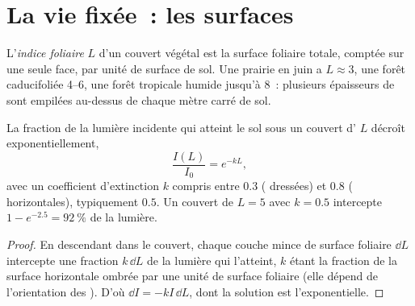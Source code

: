 \section{La vie fixée~: les surfaces}

\begin{definition}\label{def:b1:flowering-plant-organization:lai}
L'\emph{indice foliaire} $L$ d'un couvert végétal
est la surface foliaire totale, comptée sur une seule face, par unité de
surface de sol. Une prairie en juin a $L \approx 3$, une forêt
caducifoliée \qtyrange{4}{6}{}, une forêt tropicale humide jusqu'à
\qty{8}{}~: plusieurs épaisseurs de  sont empilées au-dessus de
chaque mètre carré de sol.
\end{definition}

\begin{proposition}\label{prop:b1:flowering-plant-organization:beer}
La fraction de la lumière incidente qui atteint le sol sous un couvert
d' $L$ décroît exponentiellement,
\[
\frac{I(L)}{I_0} = e^{-kL},
\]
avec un coefficient d'extinction $k$ compris entre $0.3$ (
dressées) et $0.8$ ( horizontales), typiquement $0.5$. Un
couvert de $L = 5$ avec $k = 0.5$ intercepte
$1 - e^{-2.5} = \qty{92}{\%}$ de la lumière.
\end{proposition}
\begin{proof}
En descendant dans le couvert, chaque couche mince de surface foliaire
$\dd L$ intercepte une fraction $k\,\dd L$ de la lumière qui l'atteint,
$k$ étant la fraction de la surface horizontale ombrée par une unité de
surface foliaire (elle dépend de l'orientation des ). D'où
$\dd I = -kI\,\dd L$, dont la solution est l'exponentielle.
\end{proof}

